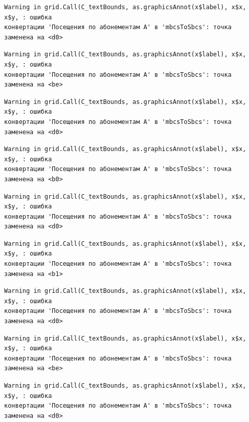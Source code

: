 \documentclass[
  letterpaper,
  DIV=11,
  numbers=noendperiod]{scrreprt}
\begin{document}
\begin{verbatim}
Warning in grid.Call(C_textBounds, as.graphicsAnnot(x$label), x$x, x$y, : ошибка
конвертации 'Посещения по абонементам А' в 'mbcsToSbcs': точка заменена на <d0>
\end{verbatim}

\begin{verbatim}
Warning in grid.Call(C_textBounds, as.graphicsAnnot(x$label), x$x, x$y, : ошибка
конвертации 'Посещения по абонементам А' в 'mbcsToSbcs': точка заменена на <be>
\end{verbatim}

\begin{verbatim}
Warning in grid.Call(C_textBounds, as.graphicsAnnot(x$label), x$x, x$y, : ошибка
конвертации 'Посещения по абонементам А' в 'mbcsToSbcs': точка заменена на <d0>
\end{verbatim}

\begin{verbatim}
Warning in grid.Call(C_textBounds, as.graphicsAnnot(x$label), x$x, x$y, : ошибка
конвертации 'Посещения по абонементам А' в 'mbcsToSbcs': точка заменена на <b0>
\end{verbatim}

\begin{verbatim}
Warning in grid.Call(C_textBounds, as.graphicsAnnot(x$label), x$x, x$y, : ошибка
конвертации 'Посещения по абонементам А' в 'mbcsToSbcs': точка заменена на <d0>
\end{verbatim}

\begin{verbatim}
Warning in grid.Call(C_textBounds, as.graphicsAnnot(x$label), x$x, x$y, : ошибка
конвертации 'Посещения по абонементам А' в 'mbcsToSbcs': точка заменена на <b1>
\end{verbatim}

\begin{verbatim}
Warning in grid.Call(C_textBounds, as.graphicsAnnot(x$label), x$x, x$y, : ошибка
конвертации 'Посещения по абонементам А' в 'mbcsToSbcs': точка заменена на <d0>
\end{verbatim}

\begin{verbatim}
Warning in grid.Call(C_textBounds, as.graphicsAnnot(x$label), x$x, x$y, : ошибка
конвертации 'Посещения по абонементам А' в 'mbcsToSbcs': точка заменена на <be>
\end{verbatim}

\begin{verbatim}
Warning in grid.Call(C_textBounds, as.graphicsAnnot(x$label), x$x, x$y, : ошибка
конвертации 'Посещения по абонементам А' в 'mbcsToSbcs': точка заменена на <d0>
\end{verbatim}
\end{document}
